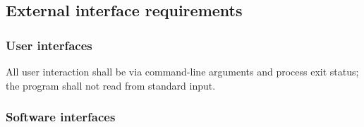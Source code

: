 \documentclass[12pt]{article}
\newcommand{\req}[1]{\textbf{[#1]}}
\begin{document}
\subsection{External interface requirements}

\subsubsection{User interfaces}

\begin{description}[style=nextline]
  \item[\req{REQ-I-01}] All user interaction shall be via
        command-line arguments and process exit status; the
        program shall not read from standard input.
\end{description}

\subsubsection{Software interfaces}
\end{document}
